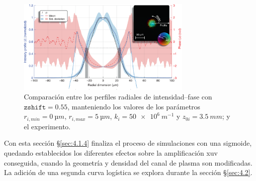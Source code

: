 \begin{figure}[htbp]
  \centering
  \includegraphics[width=0.75\textwidth]{Figuras/ch4_cmp32.png}
  \caption{Comparación entre los perfiles radiales de intensidad--fase con $\texttt{zshift}=0.55$, manteniendo los valores de los parámetros $r_{i,min}=\qty{0}{µm}$, $r_{i,max}=\qty{5}{µm}$, $k_{i}=\qty{50e6}{m^{-1}}$ y $z_{0i}=\qty{3.5}{mm}$; y el experimento.}
  \label{fig:4.18}
\end{figure}

Con esta sección \S\ref{sec:4.1.4} finaliza el proceso de simulaciones con una sigmoide, quedando establecidos los diferentes efectos sobre la amplificación \acrshort{xuv} conseguida, cuando la geometría y densidad del canal de plasma son modificadas. La adición de una segunda curva logística se explora durante la sección \S\ref{sec:4.2}.

